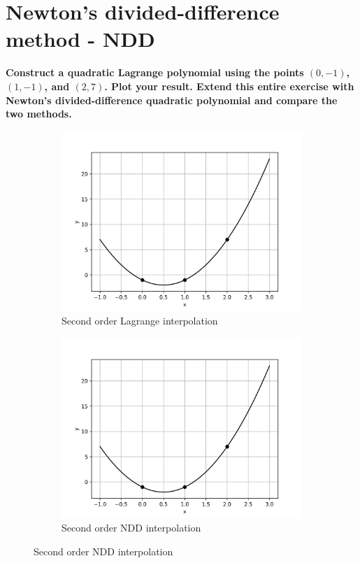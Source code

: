 \documentclass[12,a4paper]{article}
\begin{document}
    \section{Newton's divided-difference method - NDD}
    \textbf{Construct a quadratic Lagrange polynomial using the points $(0, -1)$, $(1, -1)$, and $(2, 7)$. Plot your result. Extend this entire exercise with Newton’s divided-difference quadratic polynomial and compare the two methods.}
    \begin{figure}[h!]
        \centering
        \begin{subfigure}[t]{0.49\textwidth}
            \includegraphics[width=\textwidth]{plots/q3a.png}
            \caption{Second order Lagrange interpolation}
            \label{fig:q3a}
        \end{subfigure}
        \begin{subfigure}[t]{0.49\textwidth}
            \includegraphics[width=\textwidth]{plots/q3b.png}
            \caption{Second order NDD interpolation}
            \label{fig:q3b}
        \end{subfigure}
    \end{figure}
    
\end{document}
